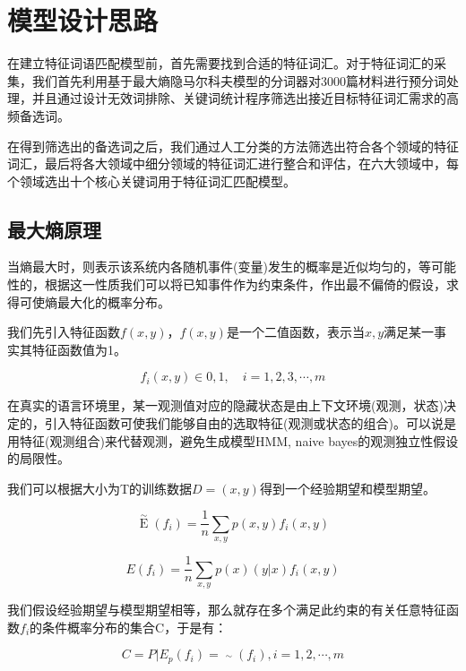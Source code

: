 \documentclass[bwprint]{cumcmthesis}
\begin{document}
\section{模型设计思路}

在建立特征词语匹配模型前，首先需要找到合适的特征词汇。对于特征词汇的采集，我们首先利用基于最大熵隐马尔科夫模型的分词器对3000篇材料进行预分词处理，并且通过设计无效词排除、关键词统计程序筛选出接近目标特征词汇需求的高频备选词。

在得到筛选出的备选词之后，我们通过人工分类的方法筛选出符合各个领域的特征词汇，最后将各大领域中细分领域的特征词汇进行整合和评估，在六大领域中，每个领域选出十个核心关键词用于特征词汇匹配模型。

\subsection{最大熵原理}

当熵最大时，则表示该系统内各随机事件(变量)发生的概率是近似均匀的，等可能性的，根据这一性质我们可以将已知事件作为约束条件，作出最不偏倚的假设，求得可使熵最大化的概率分布。 

我们先引入特征函数$f(x,y)$，$f(x,y)$是一个二值函数，表示当$x,y$满足某一事实其特征函数值为1。


\begin{equation}
	f_i(x,y) \in {0,1},\quad i = 1,2,3,\cdots,m
\end{equation}

在真实的语言环境里，某一观测值对应的隐藏状态是由上下文环境(观测，状态)决定的，引入特征函数可使我们能够自由的选取特征(观测或状态的组合)。可以说是用特征(观测组合)来代替观测，避免生成模型HMM, naive bayes的观测独立性假设的局限性。 

我们可以根据大小为T的训练数据$D={(x,y)}$得到一个经验期望和模型期望。 

\begin{equation}
	\mathop{E}\limits^{\sim}(f_i)=\frac{1}{n}\sum_{x,y}p(x,y)f_i(x,y)
\end{equation}


\begin{equation}
	E(f_i)=\frac{1}{n}\sum_{x,y}p(x)(y|x)f_i(x,y)
\end{equation}

我们假设经验期望与模型期望相等，那么就存在多个满足此约束的有关任意特征函数$f_i$的条件概率分布的集合C，于是有： 


\begin{equation}
	C = {P|E_p(f_i) = \mathop{E_p}\limits^{\sim}(f_i),i=1,2,\cdots,m}
\end{equation}
\end{document}
